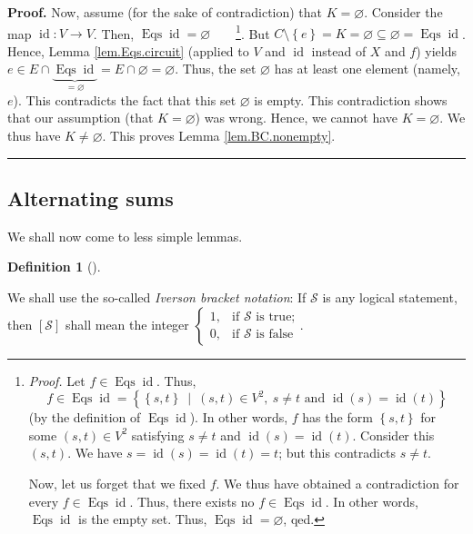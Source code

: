 \documentclass[numbers=enddot,12pt,final,onecolumn,notitlepage]{scrartcl}%
\theoremstyle{definition}
\newtheorem{defi}[theo]{Definition}
\newenvironment{definition}[1][]
{\begin{defi}[#1]\begin{leftbar}}
{\end{leftbar}\end{defi}}
\newenvironment{proof}[1][Proof]{\noindent\textbf{#1.} }{\ \rule{0.5em}{0.5em}}
\newenvironment{verlong}{}{}
\begin{document}
\begin{verlong}
\begin{proof}
Now, assume (for the sake of contradiction) that $K=\varnothing$. Consider the
map $\operatorname*{id}:V\rightarrow V$. Then, $\operatorname*{Eqs}%
\operatorname*{id}=\varnothing$\ \ \ \ \footnote{\textit{Proof.} Let
$f\in\operatorname*{Eqs}\operatorname*{id}$. Thus,%
\begin{equation}
f\in\operatorname*{Eqs}\operatorname*{id}=\left\{  \left\{  s,t\right\}
\ \mid\ \left(  s,t\right)  \in V^{2},\ s\neq t\text{ and }\operatorname*{id}%
\left(  s\right)  =\operatorname*{id}\left(  t\right)  \right\} \nonumber
\end{equation}
(by the definition of $\operatorname*{Eqs}\operatorname*{id}$). In other
words, $f$ has the form $\left\{  s,t\right\}  $ for some $\left(  s,t\right)
\in V^{2}$ satisfying $s\neq t$ and $\operatorname*{id}\left(  s\right)
=\operatorname*{id}\left(  t\right)  $. Consider this $\left(  s,t\right)  $.
We have $s=\operatorname*{id}\left(  s\right)  =\operatorname*{id}\left(
t\right)  =t$; but this contradicts $s\neq t$.
\par
Now, let us forget that we fixed $f$. We thus have obtained a contradiction
for every $f\in\operatorname*{Eqs}\operatorname*{id}$. Thus, there exists no
$f\in\operatorname*{Eqs}\operatorname*{id}$. In other words,
$\operatorname*{Eqs}\operatorname*{id}$ is the empty set. Thus,
$\operatorname*{Eqs}\operatorname*{id}=\varnothing$, qed.}. But $C\setminus
\left\{  e\right\}  =K=\varnothing\subseteq\varnothing=\operatorname*{Eqs}%
\operatorname*{id}$. Hence, Lemma \ref{lem.Eqs.circuit} (applied to $V$ and
$\operatorname*{id}$ instead of $X$ and $f$) yields $e\in E\cap
\underbrace{\operatorname*{Eqs}\operatorname*{id}}_{=\varnothing}%
=E\cap\varnothing=\varnothing$. Thus, the set $\varnothing$ has at least one
element (namely, $e$). This contradicts the fact that this set $\varnothing$
is empty. This contradiction shows that our assumption (that $K=\varnothing$)
was wrong. Hence, we cannot have $K=\varnothing$. We thus have $K\neq
\varnothing$. This proves Lemma \ref{lem.BC.nonempty}.
\end{proof}
\end{verlong}

\subsection{Alternating sums}

We shall now come to less simple lemmas.

\begin{definition}
\label{def.iverson}We shall use the so-called \emph{Iverson bracket notation}:
If $\mathcal{S}$ is any logical statement, then $\left[  \mathcal{S}\right]  $
shall mean the integer $%
\begin{cases}
1, & \text{if }\mathcal{S}\text{ is true;}\\
0, & \text{if }\mathcal{S}\text{ is false}%
\end{cases}
$.
\end{definition}
\end{document}
